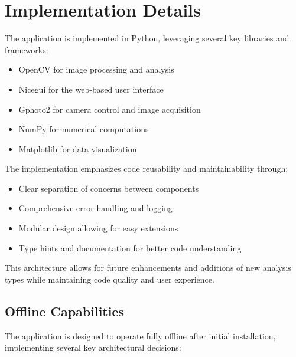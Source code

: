 \section{Implementation Details}

The application is implemented in Python, leveraging several key libraries and frameworks:

\begin{itemize}
    \item OpenCV for image processing and analysis
    \item Nicegui for the web-based user interface
    \item Gphoto2 for camera control and image acquisition
    \item NumPy for numerical computations
    \item Matplotlib for data visualization
\end{itemize}

The implementation emphasizes code reusability and maintainability through:

\begin{itemize}
    \item Clear separation of concerns between components
    \item Comprehensive error handling and logging
    \item Modular design allowing for easy extensions
    \item Type hints and documentation for better code understanding
\end{itemize}

This architecture allows for future enhancements and additions of new analysis types while maintaining code quality and user experience.

\subsection{Offline Capabilities}
The application is designed to operate fully offline after initial installation, implementing several key architectural decisions:

